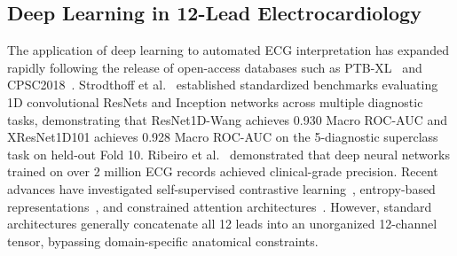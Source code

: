 \documentclass[5p,twocolumn,10pt]{elsarticle}
\begin{document}
\subsection{Deep Learning in 12-Lead Electrocardiology}
The application of deep learning to automated ECG interpretation has expanded rapidly following the release of open-access databases such as PTB-XL~\cite{wagner2020ptb} and CPSC2018~\cite{liu2018open}. Strodthoff et al.~\cite{strodthoff2020deep} established standardized benchmarks evaluating 1D convolutional ResNets and Inception networks across multiple diagnostic tasks, demonstrating that ResNet1D-Wang achieves 0.930 Macro ROC-AUC and XResNet1D101 achieves 0.928 Macro ROC-AUC on the 5-diagnostic superclass task on held-out Fold 10. Ribeiro et al.~\cite{ribeiro2020automatic} demonstrated that deep neural networks trained on over 2 million ECG records achieved clinical-grade precision. Recent advances have investigated self-supervised contrastive learning~\cite{mehari2022self}, entropy-based representations~\cite{smigiel2021ecg}, and constrained attention architectures~\cite{che2021constrained}. However, standard architectures generally concatenate all 12 leads into an unorganized 12-channel tensor, bypassing domain-specific anatomical constraints.
\end{document}
